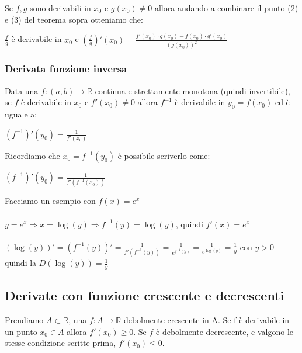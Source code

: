\begin{observation}
 Se $f,g$ sono derivabili in $x_0$ e $g(x_0) \neq 0$ allora andando a combinare il punto (2) e (3) del teorema sopra otteniamo che:
 \begin{center}\vspace{-5pt}
     $\frac{f}{g}$ è derivabile in $x_0$ e $(\frac{f}{g})'(x_0) = \frac{f'(x_0) \cdot g(x_0) - f(x_0) \cdot g'(x_0)}{(g(x_0))^2}$
 \end{center}
\end{observation}

\subsubsection{Derivata funzione inversa}
\begin{definition}
    Data una $f:(a,b) \to \mathbb{R}$ continua e strettamente monotona (quindi invertibile), se $f$ è derivabile in $x_0$ e $f'(x_0) \neq 0$ allora $f^{-1}$ è derivabile in $y_0 = f(x_0)$ ed è uguale a:
    \begin{center}
        $(f^{-1})'(y_0) = \frac{1}{f'(x_0)}$
    \end{center}
\end{definition}
\hspace{-15pt}Ricordiamo che $x_0 = f^{-1}(y_0)$ è possibile scriverlo come:
\begin{center}
    $(f^{-1})'(y_0) = \frac{1}{f'(f^{-1}(x_0))}$
\end{center}

\begin{example}
Facciamo un esempio con $f(x) = e^x$\\\\
$y = e^x \Longrightarrow x = \log(y) \Longrightarrow f^{-1}(y) = \log(y)$, quindi $f'(x) = e^x$\\\\
$(\log(y))' = (f^{-1}(y))' = \frac{1}{f'(f^{-1}(y))} = \frac{1}{e^{f^{-1}(y)}} = \frac{1}{e^{\log(y)}} = \frac{1}{y}$ con $y>0$ quindi la $D(\log(y)) = \frac{1}{y}$
\end{example}

\subsection{Derivate con funzione crescente e decrescenti}

\begin{proposition}
Prendiamo $A \subset \mathbb{R}$, una $f:A \to \mathbb{R}$ debolmente crescente in A. Se f è derivabile in un punto $x_0 \in A$ allora $f'(x_0) \geq 0$. Se $f$ è debolmente decrescente, e valgono le stesse condizione scritte prima, $f'(x_0) \leq 0$. 
\end{proposition}

